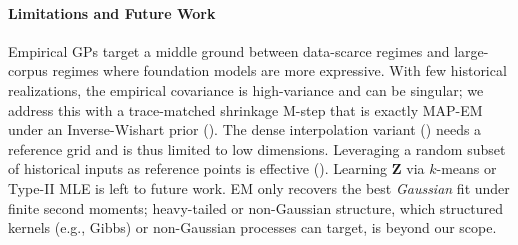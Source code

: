 \documentclass{article}
\begin{document}

\paragraph{Limitations and Future Work}
Empirical GPs target a middle ground between data-scarce regimes and
large-corpus regimes where foundation models are more expressive. With few
historical realizations, the empirical covariance is high-variance and can be
singular; we address this with a trace-matched shrinkage M-step that is exactly
MAP-EM under an Inverse-Wishart prior ().
The dense interpolation variant () needs
a reference grid and is thus limited to low dimensions.
Leveraging a random subset of historical inputs as reference
points is effective ().
Learning $\mathbf{Z}$ via $k$-means or Type-II MLE is left to future work.
EM only recovers the best \emph{Gaussian} fit under
finite second moments; heavy-tailed or non-Gaussian structure, which structured
kernels (e.g., Gibbs) or non-Gaussian processes can target, is beyond our scope.
\end{document}
